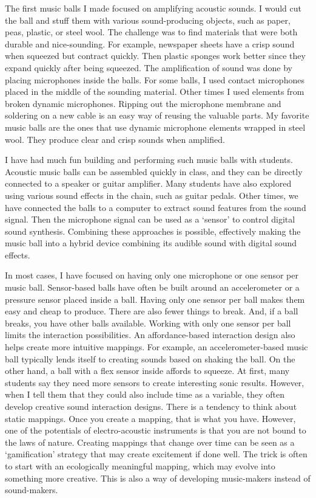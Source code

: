 The first music balls I made focused on amplifying acoustic sounds. I would cut the ball and stuff them with various sound-producing objects, such as paper, peas, plastic, or steel wool. The challenge was to find materials that were both durable and nice-sounding. For example, newspaper sheets have a crisp sound when squeezed but contract quickly. Then plastic sponges work better since they expand quickly after being squeezed. The amplification of sound was done by placing microphones inside the balls. For some balls, I used contact microphones placed in the middle of the sounding material. Other times I used elements from broken dynamic microphones. Ripping out the microphone membrane and soldering on a new cable is an easy way of reusing the valuable parts. My favorite music balls are the ones that use dynamic microphone elements wrapped in steel wool. They produce clear and crisp sounds when amplified.

I have had much fun building and performing such music balls with students. Acoustic music balls can be assembled quickly in class, and they can be directly connected to a speaker or guitar amplifier. Many students have also explored using various sound effects in the chain, such as guitar pedals. Other times, we have connected the balls to a computer to extract sound features from the sound signal. Then the microphone signal can be used as a `sensor' to control digital sound synthesis. Combining these approaches is possible, effectively making the music ball into a hybrid device combining its audible sound with digital sound effects.

In most cases, I have focused on having only one microphone or one sensor per music ball. Sensor-based balls have often be built around an accelerometer or a pressure sensor placed inside a ball. Having only one sensor per ball makes them easy and cheap to produce. There are also fewer things to break. And, if a ball breaks, you have other balls available. Working with only one sensor per ball limits the interaction possibilities. An affordance-based interaction design also helps create more intuitive mappings. For example, an accelerometer-based music ball typically lends itself to creating sounds based on shaking the ball. On the other hand, a ball with a flex sensor inside affords to squeeze. At first, many students say they need more sensors to create interesting sonic results. However, when I tell them that they could also include time as a variable, they often develop creative sound interaction designs. There is a tendency to think about static mappings. Once you create a mapping, that is what you have. However, one of the potentials of electro-acoustic instruments is that you are not bound to the laws of nature. Creating mappings that change over time can be seen as a `gamification' strategy that may create excitement if done well. The trick is often to start with an ecologically meaningful mapping, which may evolve into something more creative. This is also a way of developing music-makers instead of sound-makers.


